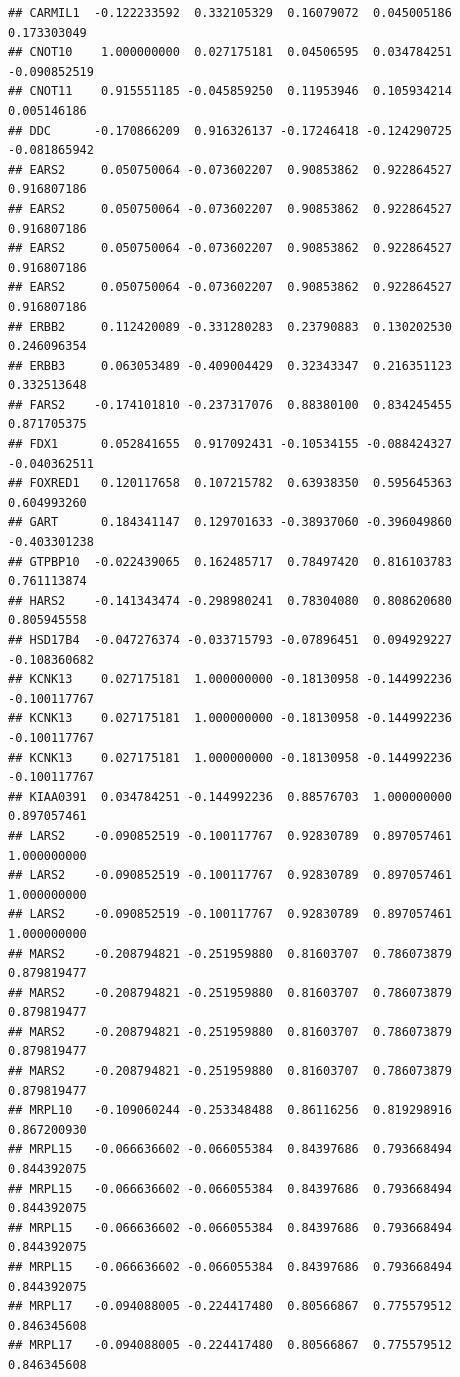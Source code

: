 \documentclass[
]{article}
\begin{document}
\begin{verbatim}
## CARMIL1  -0.122233592  0.332105329  0.16079072  0.045005186  0.173303049
## CNOT10    1.000000000  0.027175181  0.04506595  0.034784251 -0.090852519
## CNOT11    0.915551185 -0.045859250  0.11953946  0.105934214  0.005146186
## DDC      -0.170866209  0.916326137 -0.17246418 -0.124290725 -0.081865942
## EARS2     0.050750064 -0.073602207  0.90853862  0.922864527  0.916807186
## EARS2     0.050750064 -0.073602207  0.90853862  0.922864527  0.916807186
## EARS2     0.050750064 -0.073602207  0.90853862  0.922864527  0.916807186
## EARS2     0.050750064 -0.073602207  0.90853862  0.922864527  0.916807186
## ERBB2     0.112420089 -0.331280283  0.23790883  0.130202530  0.246096354
## ERBB3     0.063053489 -0.409004429  0.32343347  0.216351123  0.332513648
## FARS2    -0.174101810 -0.237317076  0.88380100  0.834245455  0.871705375
## FDX1      0.052841655  0.917092431 -0.10534155 -0.088424327 -0.040362511
## FOXRED1   0.120117658  0.107215782  0.63938350  0.595645363  0.604993260
## GART      0.184341147  0.129701633 -0.38937060 -0.396049860 -0.403301238
## GTPBP10  -0.022439065  0.162485717  0.78497420  0.816103783  0.761113874
## HARS2    -0.141343474 -0.298980241  0.78304080  0.808620680  0.805945558
## HSD17B4  -0.047276374 -0.033715793 -0.07896451  0.094929227 -0.108360682
## KCNK13    0.027175181  1.000000000 -0.18130958 -0.144992236 -0.100117767
## KCNK13    0.027175181  1.000000000 -0.18130958 -0.144992236 -0.100117767
## KCNK13    0.027175181  1.000000000 -0.18130958 -0.144992236 -0.100117767
## KIAA0391  0.034784251 -0.144992236  0.88576703  1.000000000  0.897057461
## LARS2    -0.090852519 -0.100117767  0.92830789  0.897057461  1.000000000
## LARS2    -0.090852519 -0.100117767  0.92830789  0.897057461  1.000000000
## LARS2    -0.090852519 -0.100117767  0.92830789  0.897057461  1.000000000
## MARS2    -0.208794821 -0.251959880  0.81603707  0.786073879  0.879819477
## MARS2    -0.208794821 -0.251959880  0.81603707  0.786073879  0.879819477
## MARS2    -0.208794821 -0.251959880  0.81603707  0.786073879  0.879819477
## MARS2    -0.208794821 -0.251959880  0.81603707  0.786073879  0.879819477
## MRPL10   -0.109060244 -0.253348488  0.86116256  0.819298916  0.867200930
## MRPL15   -0.066636602 -0.066055384  0.84397686  0.793668494  0.844392075
## MRPL15   -0.066636602 -0.066055384  0.84397686  0.793668494  0.844392075
## MRPL15   -0.066636602 -0.066055384  0.84397686  0.793668494  0.844392075
## MRPL15   -0.066636602 -0.066055384  0.84397686  0.793668494  0.844392075
## MRPL17   -0.094088005 -0.224417480  0.80566867  0.775579512  0.846345608
## MRPL17   -0.094088005 -0.224417480  0.80566867  0.775579512  0.846345608

\end{verbatim}
\end{document}
